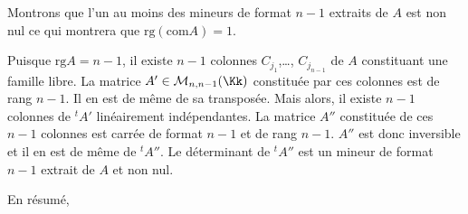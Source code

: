 {{Montrons que l'un au moins des mineurs de format $n-1$ extraits de $A$ est non nul ce qui montrera que $\text{rg}(\text{com}A)=1$.

Puisque $\text{rg}A=n-1$, il existe $n-1$ colonnes $C_{j_1}$,\ldots, $C_{j_{n-1}}$ de $A$ constituant une famille libre. La matrice $A'\in\mathcal{M}_{n,n-1}(\Kk)$ constituée par ces colonnes est de rang $n-1$. Il en est de même de sa transposée. Mais alors, il existe $n-1$ colonnes de ${^t}A'$ linéairement indépendantes. La matrice $A''$ constituée de ces $n-1$ colonnes est carrée de format $n-1$ et de rang $n-1$. $A''$ est donc inversible et il en est de même de ${^t}A''$. Le déterminant de ${^t}A''$ est un mineur de format $n-1$ extrait de $A$ et non nul.

En résumé,

\begin{center}
\end{center}
}
}

